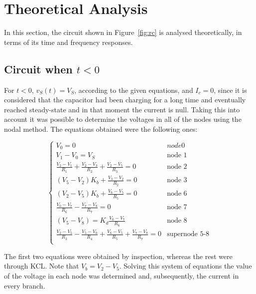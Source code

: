 \section{Theoretical Analysis}
\label{sec:analysis}

In this section, the circuit shown in Figure~\ref{fig:rc} is analysed
theoretically, in terms of its time and frequency responses.






\subsection{Circuit when $t<0$} %
For $t<0$, $v_S(t) = V_S$, according to the given equations, and $I_c=0$, since it is considered that the capacitor had been charging for a long time and eventually reached steady-state and in that moment the current is null. Taking this into account it was possible to determine the voltages in all of the nodes using the nodal method. The equations obtained were the following ones:


\begin{equation}
  \begin{cases}
  V_0 = 0 & \mbox{$node 0$}\\
  V_1-V_0 = V_S & \mbox{node 1} \\
  \frac{V_2-V_1}{R_1}+\frac{V_2-V_3}{R_2}+\frac{V_2-V_5}{R_3} = 0 & \mbox{node 2} \\
  (V_5-V_2)K_b + \frac{V_3-V_2}{R_2} = 0 & \mbox{node 3} \\
  (V_2-V_5)K_b + \frac{V_6-V_5}{R_5} = 0 & \mbox{node 6} \\
  \frac{V_0-V_7}{R_6} - \frac{V_7-V_8}{R_7} = 0 & \mbox{node 7} \\
  (V_5-V_8) = K_d \frac{V_0-V_7}{R_6} & \mbox{node 8} \\
  \frac{V_2-V_5}{R_3} - \frac{V_5-V_0}{R_4} + \frac{V_6-V_5}{R_5} + \frac{V_7-V_8}{R_7}  = 0 & \mbox{supernode 5-8} \\ 
  \end{cases}
\end{equation}

The first two equations were obtained by inspection, whereas the rest were through KCL. Note that $V_b=V_2-V_5$.
Solving this system of equations the value of the voltage in each node was determined and, subsequently, the current in every branch.

